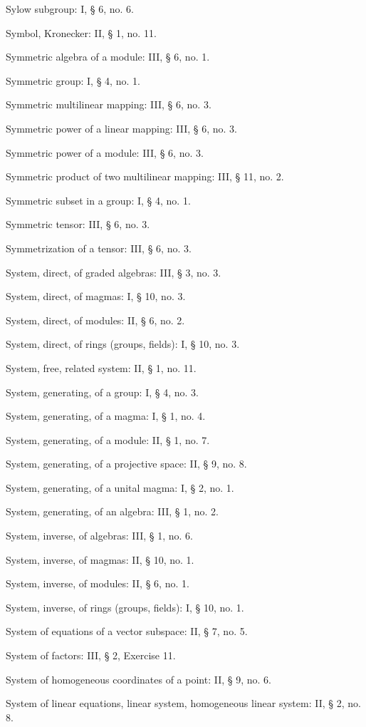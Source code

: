 Sylow subgroup: I, § 6, no. 6.

Symbol, Kronecker: II, § 1, no. 11.

Symmetric algebra of a module: III, § 6, no. 1.

Symmetric group: I, § 4, no. 1.

Symmetric multilinear mapping: III, § 6, no. 3.

Symmetric power of a linear mapping: III, § 6, no. 3.

Symmetric power of a module: III, § 6, no. 3.

Symmetric product of two multilinear mapping: III, § 11, no. 2.

Symmetric subset in a group: I, § 4, no. 1.

Symmetric tensor: III, § 6, no. 3.

Symmetrization of a tensor: III, § 6, no. 3.

System, direct, of graded algebras: III, § 3, no. 3.

System, direct, of magmas: I, § 10, no. 3.

System, direct, of modules: II, § 6, no. 2.

System, direct, of rings (groups, fields): I, § 10, no. 3.

System, free, related system: II, § 1, no. 11.

System, generating, of a group: I, § 4, no. 3.

System, generating, of a magma: I, § 1, no. 4.

System, generating, of a module: II, § 1, no. 7.

System, generating, of a projective space: II, § 9, no. 8.

System, generating, of a unital magma: I, § 2, no. 1.

System, generating, of an algebra: III, § 1, no. 2.

System, inverse, of algebras: III, § 1, no. 6.

System, inverse, of magmas: II, § 10, no. 1.

System, inverse, of modules: II, § 6, no. 1.

System, inverse, of rings (groups, fields): I, § 10, no. 1.

System of equations of a vector subspace: II, § 7, no. 5.

System of factors: III, § 2, Exercise 11.

System of homogeneous coordinates of a point: II, § 9, no. 6.

System of linear equations, linear system, homogeneous linear system: II, § 2, no. 8.

